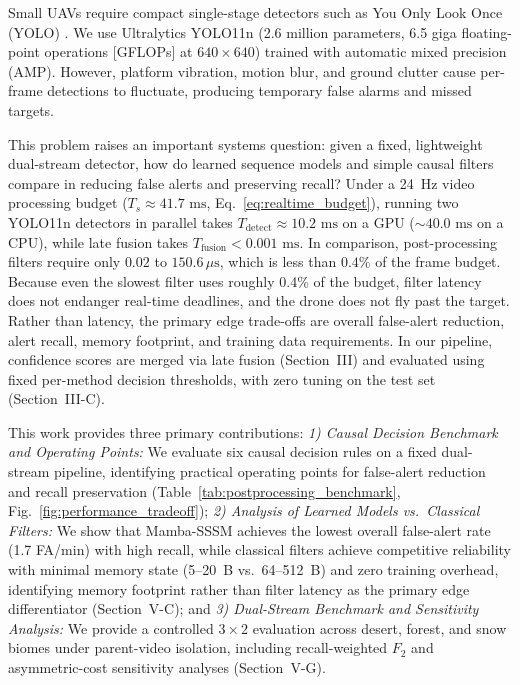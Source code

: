 \documentclass[conference]{IEEEtran}
\begin{document}
Small UAVs require compact single-stage detectors such as You Only Look Once (YOLO) \cite{redmon2016you}. We use Ultralytics YOLO11n \cite{jocher2024yolo11} (2.6 million parameters, 6.5 giga floating-point operations [GFLOPs] at $640 \times 640$) trained with automatic mixed precision (AMP). However, platform vibration, motion blur, and ground clutter cause per-frame detections to fluctuate, producing temporary false alarms and missed targets.

This problem raises an important systems question: given a fixed, lightweight dual-stream detector, how do learned sequence models and simple causal filters compare in reducing false alerts and preserving recall? Under a 24~Hz video processing budget ($T_s \approx 41.7\text{ ms}$, Eq.~\eqref{eq:realtime_budget}), running two YOLO11n detectors in parallel takes $T_{\text{detect}} \approx 10.2\text{ ms}$ on a GPU ($\sim 40.0\text{ ms}$ on a CPU), while late fusion takes $T_{\text{fusion}} < 0.001\text{ ms}$. In comparison, post-processing filters require only $0.02$ to $150.6\,\mu\text{s}$, which is less than $0.4\%$ of the frame budget. Because even the slowest filter uses roughly 0.4\% of the budget, filter latency does not endanger real-time deadlines, and the drone does not fly past the target. Rather than latency, the primary edge trade-offs are overall false-alert reduction, alert recall, memory footprint, and training data requirements. In our pipeline, confidence scores are merged via late fusion (Section~III) and evaluated using fixed per-method decision thresholds, with zero tuning on the test set (Section~III-C).

This work provides three primary contributions:
\textit{1) Causal Decision Benchmark and Operating Points:} We evaluate six causal decision rules on a fixed dual-stream pipeline, identifying practical operating points for false-alert reduction and recall preservation (Table~\ref{tab:postprocessing_benchmark}, Fig.~\ref{fig:performance_tradeoff});
\textit{2) Analysis of Learned Models vs.\ Classical Filters:} We show that Mamba-SSSM achieves the lowest overall false-alert rate (1.7 FA/min) with high recall, while classical filters achieve competitive reliability with minimal memory state (5--20~B vs.\ 64--512~B) and zero training overhead, identifying memory footprint rather than filter latency as the primary edge differentiator (Section~V-C); and
\textit{3) Dual-Stream Benchmark and Sensitivity Analysis:} We provide a controlled $3\times 2$ evaluation across desert, forest, and snow biomes under parent-video isolation, including recall-weighted $F_2$ and asymmetric-cost sensitivity analyses (Section~V-G).
\end{document}
